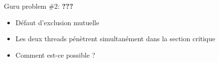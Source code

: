 \documentclass[xcolor={x11names,svgnames},x11names,svgnames]{beamer}
\begin{document}

\begin{frame}[label=peterson_report2, fragile]

  \begin{block}{Guru problem \#2: \bfseries ???}
    \begin{itemize}
    \item Défaut d'exclusion mutuelle
    \item Les deux threads pénètrent simultanément dans la section critique
    \item Comment est-ce possible ?
    \end{itemize}
  \end{block}
\end{frame}

\end{document}
